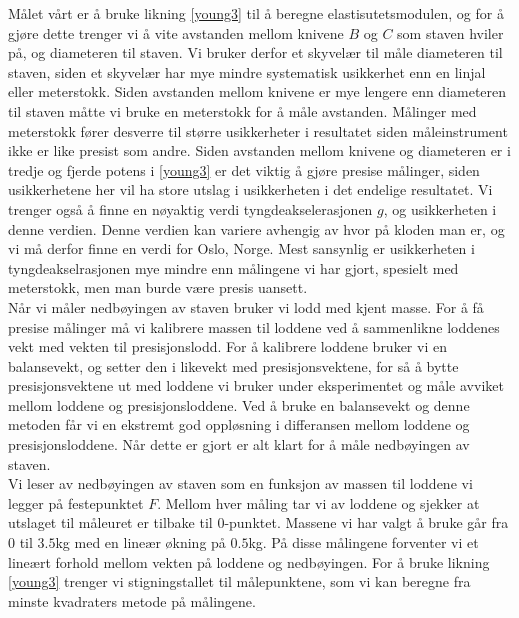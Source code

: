 \documentclass[%
 reprint,
 amsmath,amssymb,
 aps,
 norsk,
 booktabs
]{revtex4-1}
\begin{document}
Målet vårt er å bruke likning \eqref{young3} til å beregne elastisutetsmodulen, og for å gjøre dette trenger vi å vite avstanden mellom knivene $B$ og $C$ som staven hviler på, og diameteren til staven. Vi bruker derfor et skyvelær til måle diameteren til staven, siden et skyvelær har mye mindre systematisk usikkerhet enn en linjal eller meterstokk. Siden avstanden mellom knivene er mye lengere enn diameteren til staven måtte vi bruke en meterstokk for å måle avstanden. Målinger med meterstokk fører desverre til større usikkerheter i resultatet siden måleinstrument ikke er like presist som andre. Siden avstanden mellom knivene og diameteren er i tredje og fjerde potens i \eqref{young3} er det viktig å gjøre presise målinger, siden usikkerhetene her vil ha store utslag i usikkerheten i det endelige resultatet. Vi trenger også å finne en nøyaktig verdi tyngdeakselerasjonen $g$, og usikkerheten i denne verdien. Denne verdien kan variere avhengig av hvor på kloden man er, og vi må derfor finne en verdi for Oslo, Norge. Mest sansynlig er usikkerheten i tyngdeakselrasjonen mye mindre enn målingene vi har gjort, spesielt med meterstokk, men man burde være  presis uansett.\\
Når vi måler nedbøyingen av staven bruker vi lodd med kjent masse. For å få presise målinger må vi kalibrere massen til loddene ved å sammenlikne loddenes vekt med vekten til presisjonslodd. For å kalibrere loddene bruker vi en balansevekt, og setter den i likevekt med presisjonsvektene, for så å bytte presisjonsvektene ut med loddene vi bruker under eksperimentet og måle avviket mellom loddene og presisjonsloddene. Ved å bruke en balansevekt og denne metoden får vi en ekstremt god oppløsning i differansen mellom loddene og presisjonsloddene. Når dette er gjort er alt klart for å måle nedbøyingen av staven.\\
Vi leser av nedbøyingen av staven som en funksjon av massen til loddene vi legger på festepunktet $F$. Mellom hver måling tar vi av loddene og sjekker at utslaget til måleuret er tilbake til $0$-punktet. Massene vi har valgt å bruke går fra $0$ til $3.5$kg med en lineær økning på $0.5$kg. På disse målingene forventer vi et lineært forhold mellom vekten på loddene og nedbøyingen. For å bruke likning \eqref{young3} trenger vi stigningstallet til målepunktene, som vi kan beregne fra minste kvadraters metode på målingene. \\
\end{document}
